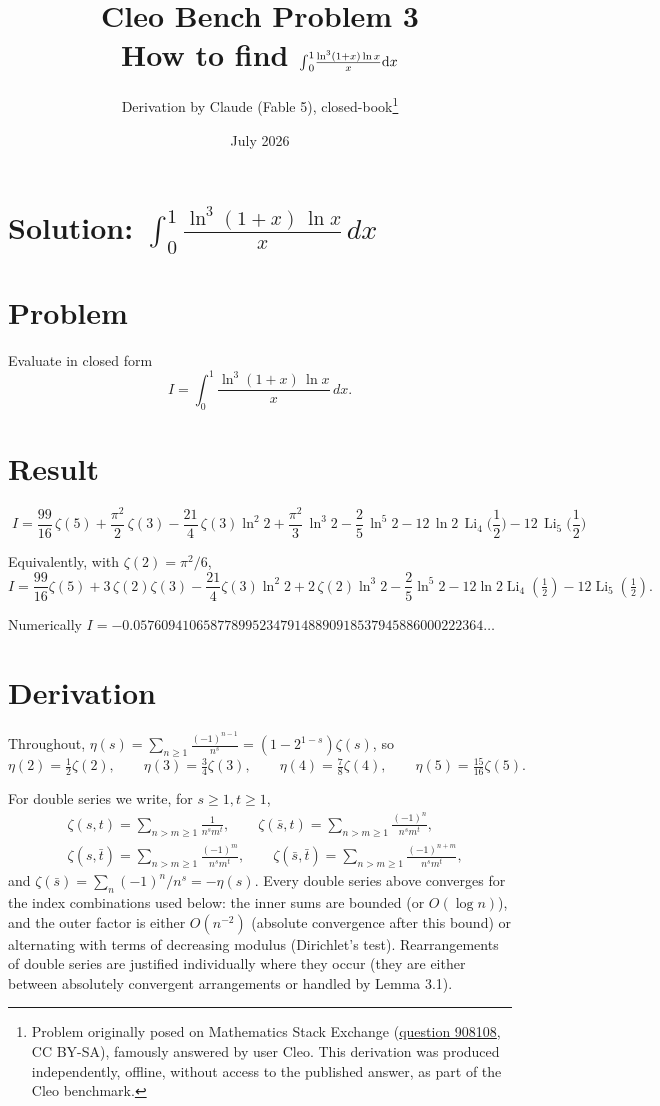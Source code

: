 \documentclass[11pt]{article}
\title{Cleo Bench Problem 3\\[1ex]\large How to find ${\large\int}_0^1\frac{\ln^3(1+x)\ln x}x\mathrm dx$}
\author{Derivation by Claude (Fable 5), closed-book\thanks{Problem originally
posed on Mathematics Stack Exchange
(\href{https://math.stackexchange.com/q/908108}{question 908108}, CC BY-SA),
famously answered by user Cleo. This derivation was produced independently,
offline, without access to the published answer, as part of the Cleo benchmark.}}
\date{July 2026}
\theoremstyle{remark}
\begin{document}
\maketitle

\section*{Solution: $\displaystyle\int_0^1\frac{\ln^3(1+x)\,\ln x}{x}\,dx$}

\section*{Problem}

Evaluate in closed form
\[
I=\int_0^1\frac{\ln^3(1+x)\,\ln x}{x}\,dx .
\]

\section*{Result}

\[
\boxed{\;I=\frac{99}{16}\,\zeta(5)+\frac{\pi^{2}}{2}\,\zeta(3)
-\frac{21}{4}\,\zeta(3)\ln^{2}2+\frac{\pi^{2}}{3}\,\ln^{3}2
-\frac{2}{5}\,\ln^{5}2-12\,\ln 2\,\operatorname{Li}_4\!\Big(\frac12\Big)
-12\,\operatorname{Li}_5\!\Big(\frac12\Big)\;}
\]

Equivalently, with $\zeta(2)=\pi^2/6$,
\[
I=\frac{99}{16}\zeta(5)+3\,\zeta(2)\zeta(3)-\frac{21}{4}\zeta(3)\ln^2 2
+2\,\zeta(2)\ln^3 2-\frac25\ln^5 2-12\ln 2\operatorname{Li}_4(\tfrac12)-12\operatorname{Li}_5(\tfrac12).
\]

Numerically $I=-0.05760941065877899523479148890918537945886000222364\ldots$

\section*{Derivation}

Throughout, $\eta(s)=\sum_{n\ge1}\frac{(-1)^{n-1}}{n^s}=(1-2^{1-s})\zeta(s)$, so
\[
\eta(2)=\tfrac12\zeta(2),\qquad \eta(3)=\tfrac34\zeta(3),\qquad
\eta(4)=\tfrac78\zeta(4),\qquad \eta(5)=\tfrac{15}{16}\zeta(5).
\]

For double series we write, for $s\ge1,t\ge1$,
\[
\begin{aligned}
&\zeta(s,t)=\sum_{n>m\ge1}\frac{1}{n^s m^t},\qquad
\zeta(\bar s,t)=\sum_{n>m\ge1}\frac{(-1)^n}{n^s m^t},\\
&\zeta(s,\bar t)=\sum_{n>m\ge1}\frac{(-1)^m}{n^s m^t},\qquad
\zeta(\bar s,\bar t)=\sum_{n>m\ge1}\frac{(-1)^{n+m}}{n^s m^t},
\end{aligned}
\]
and $\zeta(\bar s)=\sum_n(-1)^n/n^s=-\eta(s)$. Every double series above converges for the index
combinations used below: the inner sums are bounded (or $O(\log n)$), and the outer factor is
either $O(n^{-2})$ (absolute convergence after this bound) or alternating with terms of decreasing
modulus (Dirichlet's test). Rearrangements of double series are justified individually where they
occur (they are either between absolutely convergent arrangements or handled by Lemma 3.1).
\end{document}
